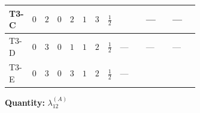 \documentclass[8pt]{article}
\begin{document}
\begin{landscape}
\begin{longtable}{@{}llcccccc >{\raggedright\arraybackslash}p{0.21\linewidth} >{\raggedright\arraybackslash}p{0.21\linewidth} >{\raggedright\arraybackslash}p{0.21\linewidth}@{}}
\midrule
T3-C & $0$ & $2$ & $0$ & $2$ & $1$ & $3$ & $\frac{1}{2}$ & \scriptsize\adjustbox{max width=\linewidth}{$\begin{gathered} {\lambda_{12}^{(A)}} (3 T_{\nu}^{(1)}+3 T_{\nu}^{(2)})\end{gathered}$} & --- & --- \\
\midrule
T3-D & $0$ & $3$ & $0$ & $1$ & $1$ & $2$ & $\frac{1}{2}$ & --- & --- & --- \\
\midrule
T3-E & $0$ & $3$ & $0$ & $3$ & $1$ & $2$ & $\frac{1}{2}$ & --- & \scriptsize\adjustbox{max width=\linewidth}{$\begin{gathered} {\lambda_{12}^{(A)}} \left(2 T_{\nu}^{(1)}+2 T_{\nu}^{(2)}+\frac{16 {\lambda_{12}^{(\times)}}}{3}\right)\end{gathered}$} & \scriptsize\adjustbox{max width=\linewidth}{$\begin{gathered} +16 {\lambda_{12}^{(A)}} {\lambda_{S_1}^{(A)}}\end{gathered}$} \\
\midrule
\bottomrule
\end{longtable}
\clearpage
\noindent\textbf{Quantity: }$\lambda_{12}^{(A)}$\par\smallskip

\end{landscape}
\end{document}
